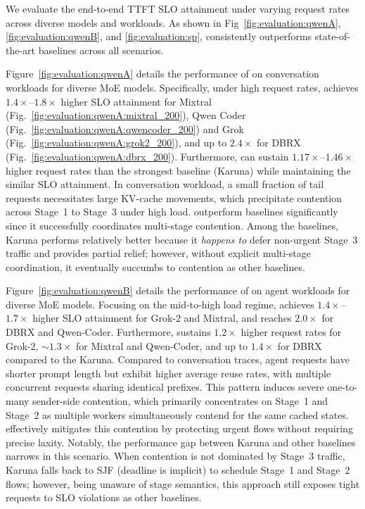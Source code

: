  We evaluate the end-to-end TTFT SLO attainment under varying request rates across diverse models and workloads. As shown in Fig~\ref{fig:evaluation:qwenA}, \ref{fig:evaluation:qwenB}, and \ref{fig:evaluation:sp}, \sys{} consistently outperforms state-of-the-art baselines across all scenarios.

Figure~\ref{fig:evaluation:qwenA} details the performance of \sys{} on conversation workloads for diverse MoE models. Specifically, under high request rates, \sys{} achieves $1.4\times$--$1.8\times$ higher SLO attainment for Mixtral (Fig.~\ref{fig:evaluation:qwenA:mixtral_200}), Qwen Coder (Fig.~\ref{fig:evaluation:qwenA:qwencoder_200}) and Grok (Fig.~\ref{fig:evaluation:qwenA:grok2_200}), and up to $2.4\times$ for DBRX (Fig.~\ref{fig:evaluation:qwenA:dbrx_200}). Furthermore, \sys{} can sustain $1.17\times$--$1.46\times$ higher request rates than the strongest baseline (Karuna) while maintaining the similar SLO attainment. In conversation workload, a small fraction of tail requests necessitates large KV-cache movements, which precipitate contention across Stage~1 to Stage~3 under high load. \sys{} outperform baselines significantly since it successfully coordinates multi-stage contention. Among the baselines, Karuna performs relatively better because it \emph{happens to} defer non-urgent Stage~3 traffic and provides partial relief; however, without explicit multi-stage coordination, it eventually succumbs to contention as other baselines.

Figure~\ref{fig:evaluation:qwenB} details the performance of \sys{} on agent workloads for diverse MoE models. Focusing on the mid-to-high load regime, \sys{} achieves $1.4\times$--$1.7\times$ higher SLO attainment for Grok-2 and Mixtral, and reaches $2.0\times$ for DBRX and Qwen-Coder. Furthermore, \sys{} sustains $1.2\times$ higher request rates for Grok-2, $\sim1.3\times$ for Mixtral and Qwen-Coder, and up to $1.4\times$ for DBRX compared to the Karuna. Compared to conversation traces, agent requests have shorter prompt length but exhibit higher average reuse rates, with multiple concurrent requests sharing identical prefixes. This pattern induces severe one-to-many sender-side contention, which primarily concentrates on Stage~1 and Stage~2 as multiple workers simultaneously contend for the same cached states. \sys{} effectively mitigates this contention by protecting urgent flows without requiring precise laxity. Notably, the performance gap between Karuna and other baselines narrows in this scenario. When contention is not dominated by Stage~3 traffic, Karuna falls back to SJF (deadline is implicit) to schedule Stage~1 and Stage~2 flows; however, being unaware of stage semantics, this approach still exposes tight requests to SLO violations as other baselines.

